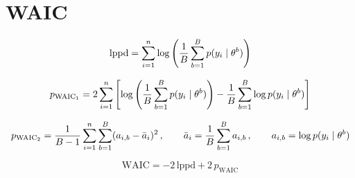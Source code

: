 \documentclass[letterpaper,12pt,openany]{article}
\def\frac#1#2{{{#1}\over{#2}}}
\begin{document}
\section{WAIC}

$$
\text{lppd} = \sum_{i=1}^n\log\left(\frac{1}{B} \sum_{b=1}^B p(y_i\mid\theta^b) \right)
$$

$$
p_{\text{WAIC}_1} = 2\sum_{i=1}^n\left[ \log\left(\frac{1}{B} \sum_{b=1}^B p(y_i\mid\theta^b)\right) - \frac{1}{B} \sum_{b=1}^B \log p(y_i\mid\theta^b) \right]
$$

$$
p_{\text{WAIC}_2} = \frac{1}{B-1}\sum_{i=1}^n\sum_{b=1}^B (a_{i,b} - \bar{a}_i )^2\,,\qquad \bar{a}_i = \frac{1}{B}\sum_{b=1}^B a_{i,b} \,,\qquad a_{i,b} = \log p(y_i\mid \theta^b)
$$

$$
\text{WAIC} = -2\,\text{lppd} + 2\,p_{\text{WAIC}}
$$
\end{document}

